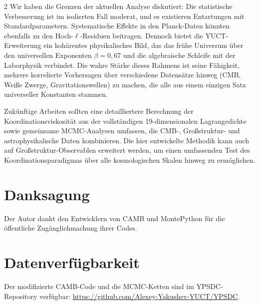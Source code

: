 \documentclass[11pt,a4paper]{article}
\begin{document}
\begin{multicols}{2}
		Wir haben die Grenzen der aktuellen Analyse diskutiert: Die statistische Verbesserung ist im isolierten Fall moderat, und es existieren Entartungen mit Standardparametern. Systematische Effekte in den Planck-Daten könnten ebenfalls zu den Hoch-$\ell$-Residuen beitragen. Dennoch bietet die YUCT-Erweiterung ein kohärentes physikalisches Bild, das das frühe Universum über den universellen Exponenten $\beta=0,67$ und die algebraische Schleife mit der Laborphysik verbindet. Die wahre Stärke dieses Rahmens ist seine Fähigkeit, mehrere korrelierte Vorhersagen über verschiedene Datensätze hinweg (CMB, Weiße Zwerge, Gravitationswellen) zu machen, die alle aus einem einzigen Satz universeller Konstanten stammen.
		
		Zukünftige Arbeiten sollten eine detailliertere Berechnung der Koordinationsviskosität aus der vollständigen 19-dimensionalen Lagrangedichte sowie gemeinsame MCMC-Analysen umfassen, die CMB-, Großstruktur- und astrophysikalische Daten kombinieren. Die hier entwickelte Methodik kann auch auf Großstruktur-Observablen erweitert werden, um einen umfassenden Test des Koordinationsparadigmas über alle kosmologischen Skalen hinweg zu ermöglichen.
		
		\section*{Danksagung}
		
		Der Autor dankt den Entwicklern von CAMB und MontePython für die öffentliche Zugänglichmachung ihrer Codes.
		
		\section*{Datenverfügbarkeit}
		
		Der modifizierte CAMB-Code und die MCMC-Ketten sind im YPSDC-Repository verfügbar: \url{https://github.com/Alexey-Yakushev-YUCT/YPSDC}.
		

\end{multicols}
\end{document}
